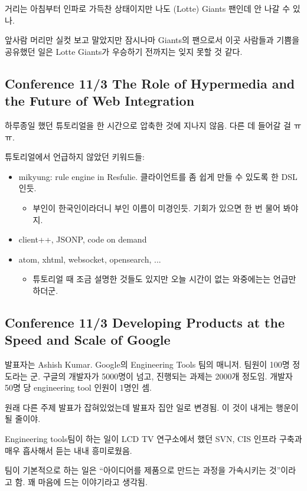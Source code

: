 \documentclass[a4paper]{article}
\begin{document}
거리는 아침부터 인파로 가득찬 상태이지만 나도 (Lotte) Giants 팬인데 안
나갈 수 있나.
 
앞사람 머리만 실컷 보고 말았지만 잠시나마 Giants의 팬으로서 이곳
사람들과 기쁨을 공유했던 일은 Lotte Giants가 우승하기 전까지는 잊지
못할 것 같다.
 
\subsection{Conference 11/3 The Role of Hypermedia and the Future of
  Web Integration}
 
하루종일 했던 튜토리얼을 한 시간으로 압축한 것에 지나지 않음. 다른 데
들어갈 걸 ㅠㅠ.
 
튜토리얼에서 언급하지 않았던 키워드들:
\begin{itemize}
\item mikyung: rule engine in Resfulie. 클라이언트를 좀 쉽게 만들 수
  있도록 한 DSL인듯.
  \begin{itemize}
  \item 부인이 한국인이라더니 부인 이름이 미경인듯. 기회가 있으면 한 번
    물어 봐야지.
  \end{itemize}
\item client++, JSONP, code on demand
\item atom, xhtml, websocket, opensearch, ...
  \begin{itemize}
  \item 튜토리얼 때 조금 설명한 것들도 있지만 오늘 시간이 없는
    와중에는는 언급만 하더군.
  \end{itemize}
\end{itemize}
 
\subsection{Conference 11/3 Developing Products at the Speed and Scale
  of Google}
 
발표자는 Ashish Kumar. Google의 Engineering Tools 팀의 매니저. 팀원이
100명 정도라는 군.  구글의 개발자가 5000명이 넘고, 진행되는 과제는
2000개 정도임. 개발자 50명 당 engineering tool 인원이 1명인 셈.
 
원래 다른 주제 발표가 잡혀있었는데 발표자 집안 일로 변경됨. 이 것이
내게는 행운이 될 줄이야.
 
Engineering tools팀이 하는 일이 LCD TV 연구소에서 했던 SVN, CIS 인프라
구축과 매우 흡사해서 듣는 내내 흥미로웠음.
 
팀이 기본적으로 하는 일은 ``아이디어를 제품으로 만드는 과정을 가속시키는
것''이라고 함. 꽤 마음에 드는 이야기라고 생각됨.
\end{document}
